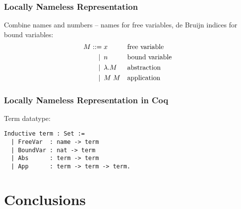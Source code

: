 \documentclass[notheorems]{beamer}
\begin{document}
\begin{frame}

  \frametitle{Locally Nameless Representation}

  Combine names and numbers -- names for free variables, de Bruijn indices for bound variables:
  \begin{align*}
    M ::=             &\; x
    && \text{free variable} \\
    \llap{\textbar\:} &\; n
    && \text{bound variable} \\
    \llap{\textbar\:} &\; \lambda .M
    && \text{abstraction} \\
    \llap{\textbar\:} &\; M \; M
    && \text{application} \\
  \end{align*}



\end{frame}


\begin{frame}[fragile]

  \frametitle{Locally Nameless Representation in Coq}

  Term datatype:
  \begin{lstlisting}
Inductive term : Set :=
  | FreeVar  : name -> term
  | BoundVar : nat -> term
  | Abs      : term -> term
  | App      : term -> term -> term.
  \end{lstlisting}

\end{frame}










\section{Conclusions}


\end{document}
